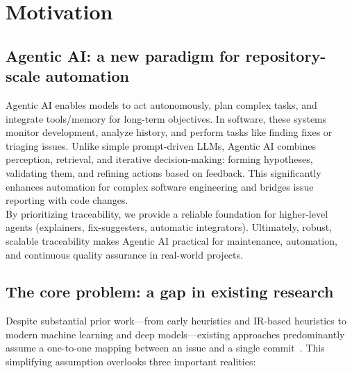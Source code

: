 
\section{Motivation}

\subsection{Agentic AI: a new paradigm for repository-scale automation}
Agentic AI enables models to act autonomously, plan complex tasks, and integrate tools/memory for long-term objectives. In software, these systems monitor development, analyze history, and perform tasks like finding fixes or triaging issues. Unlike simple prompt-driven LLMs, Agentic AI combines perception, retrieval, and iterative decision-making: forming hypotheses, validating them, and refining actions based on feedback. This significantly enhances automation for complex software engineering and bridges issue reporting with code changes.\\

\noindent
By prioritizing traceability, we provide a reliable foundation for higher-level agents (explainers, fix-suggesters, automatic integrators). Ultimately, robust, scalable traceability makes Agentic AI practical for maintenance, automation, and continuous quality assurance in real-world projects.


\subsection{The core problem: a gap in existing research}

Despite substantial prior work—from early heuristics and IR-based heuristics to modern machine learning and deep models—existing approaches predominantly assume a one-to-one mapping between an issue and a single commit~\cite{r17,r19,r20,r7,r31}. This simplifying assumption overlooks three important realities:

